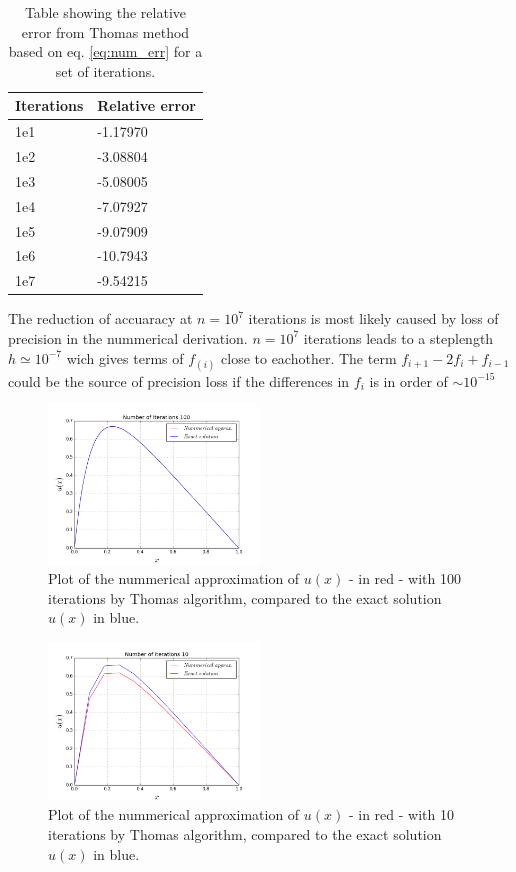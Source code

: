\documentclass[twoside,twocolumn]{article}
\begin{document}
\begin{table}[htp]
\centering
\begin{tabular}{|l|l|} \hline
Iterations & Relative error\\ \hline
1e1 & -1.17970\\
1e2 & -3.08804\\
1e3 & -5.08005\\
1e4 & -7.07927\\
1e5 & -9.07909\\
1e6 & -10.7943\\
1e7 & -9.54215\\ \hline
\end{tabular}
\caption{Table showing the relative error from Thomas method based on eq. \ref{eq:num_err} for a set of iterations.}\label{tbl:error}
\end{table}
\newpage
The reduction of accuaracy at $n=10^7$ iterations  is most likely caused by loss of precision in the nummerical derivation. $n=10^7$ iterations leads to a steplength $h\simeq 10^{-7}$ wich gives terms of $f_(i)$ close to eachother. The term $f_{i+1}-2f_i+f_{i-1}$ could be the source of precision loss if the differences in $f_i$ is in order of $\sim10^{-15}$

\begin{figure}[htp]
\includegraphics[width=0.5\textwidth]{./figures/b-run1e2.png} 
\caption{Plot of the nummerical approximation of $u(x)$ - in red - with 100 iterations by Thomas algorithm, compared to the exact solution $u(x)$ in blue.} \label{fig:Thomas1E2}
\end{figure}

\begin{figure}[htp]
\includegraphics[width=0.5\textwidth]{./figures/b-run10.png} 
\caption{Plot of the nummerical approximation of $u(x)$ - in red - with 10 iterations by Thomas algorithm, compared to the exact solution $u(x)$ in blue.} \label{fig:Thomas10}
\end{figure}
\end{document}
